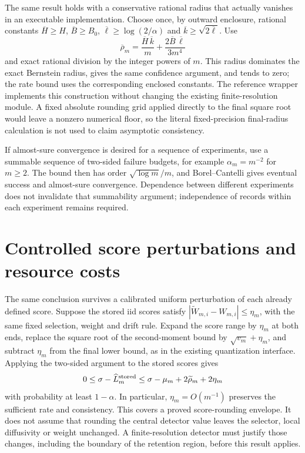 The same result holds with a conservative rational radius that actually
vanishes in an executable implementation. Choose once, by outward
enclosure, rational constants $\overline H\geq H$,
$\overline B\geq B_0$, $\overline\ell\geq\log(2/\alpha)$ and
$\overline k\geq\sqrt{2\overline\ell}$. Use
\begin{equation}
 \overline\rho_m=
 \frac{\overline H\,\overline k}{m}
       +\frac{2\overline B\,\overline\ell}{3m^4}
 \label{eq:og-consistency-rational-radius}
\end{equation}
and exact rational division by the integer powers of $m$. This radius
dominates the exact Bernstein radius, gives the same confidence argument,
and tends to zero; the rate bound uses the corresponding enclosed constants.
The reference wrapper implements this construction without changing the
existing finite-resolution module. A fixed absolute rounding grid applied
directly to the final square root would leave a nonzero numerical floor,
so the literal fixed-precision final-radius calculation is not used to claim
asymptotic consistency.

If almost-sure convergence is desired for a sequence of experiments, use a
summable sequence of two-sided failure budgets, for example
$\alpha_m=m^{-2}$ for $m\geq2$. The bound then has order
$\sqrt{\log m}/m$, and Borel--Cantelli gives eventual success and
almost-sure convergence. Dependence between different experiments does not
invalidate that summability argument; independence of records within each
experiment remains required.

\section{Controlled score perturbations and resource costs}

The same conclusion survives a calibrated uniform perturbation of each
already defined score. Suppose the stored iid scores satisfy
$|\widetilde W_{m,i}-W_{m,i}|\leq\eta_m$, with the same fixed selection,
weight and drift rule. Expand the score range by $\eta_m$ at both ends,
replace the square root of the second-moment bound by
$\sqrt{v_m}+\eta_m$, and subtract $\eta_m$ from the final lower bound,
as in the existing quantization interface. Applying the two-sided argument
to the stored scores gives
\begin{equation}
 0\leq\sigma-\widehat L_m^{\rm stored}
 \leq\sigma-\mu_m+2\widetilde\rho_m+2\eta_m
 \label{eq:og-consistency-perturbed}
\end{equation}
with probability at least $1-\alpha$. In particular, $\eta_m=O(m^{-1})$
preserves the sufficient rate and consistency. This covers a proved
score-rounding envelope. It does not assume that rounding the central
detector value leaves the selector, local diffusivity or weight unchanged.
A finite-resolution detector must justify those changes, including the
boundary of the retention region, before this result applies.

